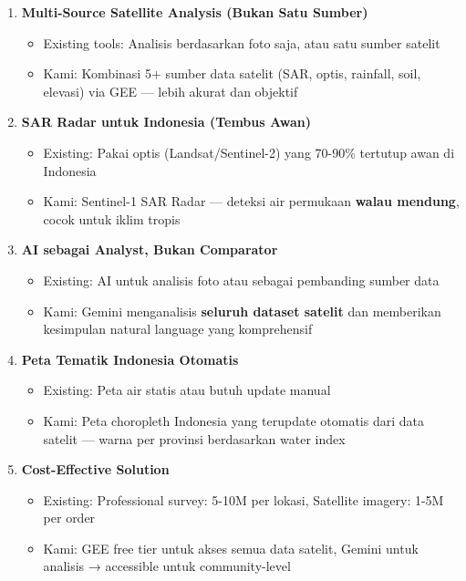 \documentclass[12pt,a4paper]{article}
\begin{document}
\begin{enumerate}
  \item \textbf{Multi-Source Satellite Analysis (Bukan Satu Sumber)}
  \begin{itemize}
    \item Existing tools: Analisis berdasarkan foto saja, atau satu sumber satelit
    \item Kami: Kombinasi 5+ sumber data satelit (SAR, optis, rainfall, soil, elevasi) via GEE — lebih akurat dan objektif
  \end{itemize}

  \item \textbf{SAR Radar untuk Indonesia (Tembus Awan)}
  \begin{itemize}
    \item Existing: Pakai optis (Landsat/Sentinel-2) yang 70-90\% tertutup awan di Indonesia
    \item Kami: Sentinel-1 SAR Radar — deteksi air permukaan \textbf{walau mendung}, cocok untuk iklim tropis
  \end{itemize}

  \item \textbf{AI sebagai Analyst, Bukan Comparator}
  \begin{itemize}
    \item Existing: AI untuk analisis foto atau sebagai pembanding sumber data
    \item Kami: Gemini menganalisis \textbf{seluruh dataset satelit} dan memberikan kesimpulan natural language yang komprehensif
  \end{itemize}

  \item \textbf{Peta Tematik Indonesia Otomatis}
  \begin{itemize}
    \item Existing: Peta air statis atau butuh update manual
    \item Kami: Peta choropleth Indonesia yang terupdate otomatis dari data satelit — warna per provinsi berdasarkan water index
  \end{itemize}

  \item \textbf{Cost-Effective Solution}
  \begin{itemize}
    \item Existing: Professional survey: 5-10M per lokasi, Satellite imagery: 1-5M per order
    \item Kami: GEE free tier untuk akses semua data satelit, Gemini untuk analisis → accessible untuk community-level
  \end{itemize}
\end{enumerate}
\end{document}
